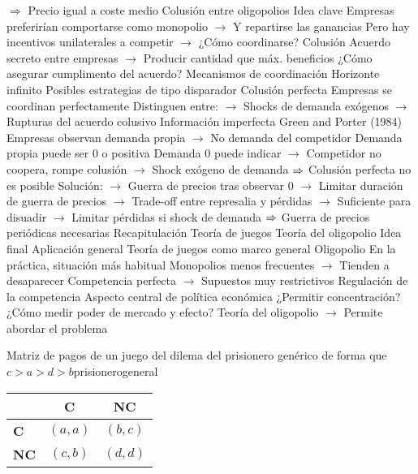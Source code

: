 \documentclass{nuevotema}
\begin{document}
\begin{esquemal}
				\4[] $\Rightarrow$ Precio igual a coste medio
		\2 Colusión entre oligopolios
			\3 Idea clave
				\4 Empresas preferirían comportarse como monopolio
				\4[] $\to$ Y repartirse las ganancias
				\4 Pero hay incentivos unilaterales a competir
				\4[] $\to$ ¿Cómo coordinarse?
				\4 Colusión
				\4[] Acuerdo secreto entre empresas
				\4[] $\to$ Producir cantidad que máx. beneficios
				\4 ¿Cómo asegurar cumplimento del acuerdo?
			\3 Mecanismos de coordinación
				\4 Horizonte infinito
				\4[] Posibles estrategias de tipo disparador
				\4 Colusión perfecta
				\4[] Empresas se coordinan perfectamente
				\4[] Distinguen entre:
				\4[] $\to$ Shocks de demanda exógenos
				\4[] $\to$ Rupturas del acuerdo colusivo
				\4 Información imperfecta
				\4[] Green and Porter (1984)
				\4[] Empresas observan demanda propia
				\4[] $\to$ No demanda del competidor
				\4[] Demanda propia puede ser 0 o positiva
				\4[] Demanda 0 puede indicar
				\4[] $\to$ Competidor no coopera, rompe colusión
				\4[] $\to$ Shock exógeno de demanda
				\4[] $\Rightarrow$ Colusión perfecta no es posible
				\4[] Solución:
				\4[] $\to$ Guerra de precios tras observar 0
				\4[] $\to$ Limitar duración de guerra de precios
				\4[] $\to$ Trade-off entre represalia y pérdidas
				\4[] $\to$ Suficiente para disuadir
				\4[] $\to$ Limitar pérdidas si shock de demanda
				\4[] $\Rightarrow$ Guerra de precios periódicas necesarias
	\1[] 
		\2 Recapitulación
			\3 Teoría de juegos
			\3 Teoría del oligopolio
		\2 Idea final
			\3 Aplicación general
				\4 Teoría de juegos como marco general
				\4 Oligopolio
				\4[] En la práctica, situación más habitual
				\4[] Monopolios menos frecuentes
				\4[] $\to$ Tienden a desaparecer
				\4[] Competencia perfecta
				\4[] $\to$ Supuestos muy restrictivos
			\3 Regulación de la competencia
				\4 Aspecto central de política económica
				\4 ¿Permitir concentración?
				\4 ¿Cómo medir poder de mercado y efecto?
				\4 Teoría del oligopolio
				\4[] $\to$ Permite abordar el problema
\end{esquemal}

\graficas

\begin{tabla}{Matriz de pagos de un juego del dilema del prisionero genérico de forma que $c > a > d > b$}{prisionerogeneral}
		\begin{tabular}{l || c | c}
			& \textbf{C} & \textbf{NC} \\ \hline \hline
			\textbf{C} & $(a,a)$ & $(b,c)$  \\ \hline
			\textbf{NC} & $(c,b)$ & $(d, d)$ \\ \hline
		\end{tabular}
\end{tabla}
\end{document}
